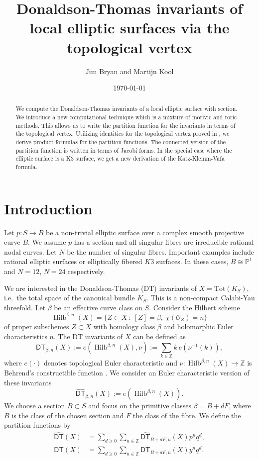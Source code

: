 \documentclass{amsart}
\title[DT invariants of local elliptic surfaces]{Donaldson-Thomas invariants of local elliptic surfaces via the topological vertex}
\author{Jim Bryan and Martijn Kool}
\date{\today}
\theoremstyle{definition}
\newcommand{\ZZ} {\mathbb{Z}}		%
\newcommand{\PP} {\mathbb{P}}
\renewcommand{\O}{\mathcal{O}}
\newcommand{\Hilb}{\operatorname{Hilb}}
\newcommand{\DT}{\mathsf{DT}}
\newcommand{\DThat}{\widehat{\DT}}
\begin{document}
\begin{abstract}

We compute the Donaldson-Thomas invariants of a local elliptic surface
with section. We introduce a new computational technique which is a
mixture of motivic and toric methods. This allows us to write the
partition function for the invariants in terms of the topological
vertex. Utilizing identities for the topological vertex proved in
\cite{BKY}, we derive product formulas for the partition
functions. The connected version of the partition function is written
in terms of Jacobi forms.  In the special case where the elliptic
surface is a K3 surface, we get a new derivation of the
Katz-Klemm-Vafa formula.
\end{abstract}

\maketitle 





\section{Introduction}

Let $p : S \rightarrow B$ be a non-trivial elliptic surface over a
complex smooth projective curve $B$. We assume $p$ has a section and
all singular fibres are irreducible rational nodal curves. Let $N$ be
the number of singular fibres. Important examples include rational
elliptic surfaces or elliptically fibered $K3$ surfaces. In these
cases, $B \cong \PP^1$ and $N = 12$, $N=24$ respectively.

We are interested in the Donaldson-Thomas (DT) invariants of $X =
\mathrm{Tot}(K_S)$, i.e.~the total space of the canonical bundle
$K_S$. This is a non-compact Calabi-Yau threefold. Let $\beta$ be an
effective curve class on $S$. Consider the Hilbert scheme
$$
\Hilb^{\beta,n}(X) = \{ Z \subset X \ : \ [Z] = \beta, \ \chi(\O_Z) = n\}
$$
of proper subschemes $Z \subset X$ with homology class $\beta$ and holomorphic Euler characteristics $n$. The DT invariants of $X$ can be defined as
$$
\DT_{\beta,n}(X) := e(\Hilb^{\beta,n}(X), \nu) := \sum_{k \in \ZZ} k \ e(\nu^{-1}(k)),
$$
where $e(\cdot)$ denotes topological Euler characteristic and $\nu :
\Hilb^{\beta,n}(X) \rightarrow \ZZ$ is Behrend's constructible
function \cite{Beh}. We consider an Euler characteristic version of
these invariants
$$
\DThat _{\beta,n}(X) := e(\Hilb^{\beta,n}(X)).
$$
We choose a section $B \subset S$ and focus on the primitive classes
$\beta = B + dF$, where $B$ is the class of the chosen section and $F$
the class of the fibre. We define the partition functions by
\begin{align*}
\DThat (X)& = \sum_{d \geq 0} \sum_{n \in \ZZ} \DThat _{B+dF,n}(X) p^n q^d,\\
\DT (X)& = \sum_{d \geq 0} \sum_{n \in \ZZ} \DT_{B+dF,n}(X) y^n q^d.
\end{align*}
\end{document}

